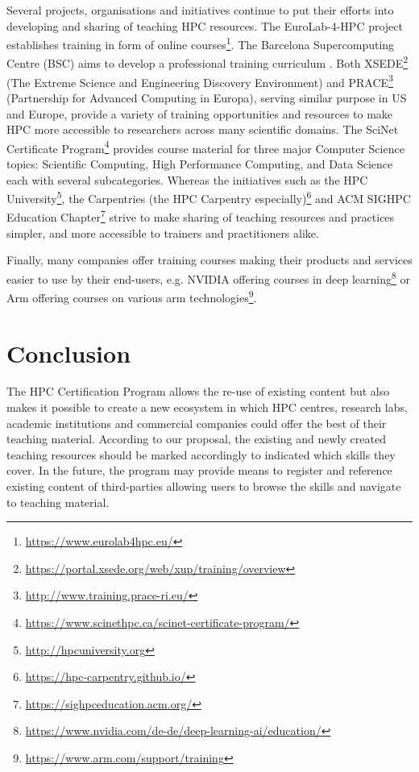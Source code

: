 \documentclass[jocse]{jocseart}
\begin{document}
Several projects, organisations and initiatives continue to put their efforts into developing and sharing of teaching HPC resources.
The EuroLab-4-HPC project establishes training in form of online courses\footnote{\url{https://www.eurolab4hpc.eu/}}.
The Barcelona Supercomputing Centre (BSC) aims to develop a professional training curriculum \cite{sancho2016bsc}.
Both XSEDE\footnote{\url{https://portal.xsede.org/web/xup/training/overview}} (The Extreme Science and Engineering Discovery Environment) and PRACE\footnote{\url{http://www.training.prace-ri.eu/}} (Partnership for Advanced Computing in Europa), serving similar purpose in US and Europe, provide a variety of training opportunities and resources to make HPC more accessible to researchers across many scientific domains.
The SciNet Certificate Program\footnote{\url{https://www.scinethpc.ca/scinet-certificate-program/}} provides course material for three major Computer Science topics: Scientific Computing, High Performance Computing, and Data Science each with several subcategories.
Whereas the initiatives such as the HPC University\footnote{\url{http://hpcuniversity.org}}, the Carpentries (the HPC Carpentry especially)\footnote{\url{https://hpc-carpentry.github.io/}} and ACM SIGHPC Education Chapter\footnote{\url{https://sighpceducation.acm.org/}} strive to make sharing of teaching resources and practices simpler, and more accessible to trainers and practitioners alike.

Finally, many companies offer training courses making their products and services easier to use by their end-users, e.g. NVIDIA offering courses in deep learning\footnote{\url{https://www.nvidia.com/de-de/deep-learning-ai/education/}} or Arm offering courses on various arm technologies\footnote{\url{https://www.arm.com/support/training}}.

\section{Conclusion}
\label{sec:conclusion}

The HPC Certification Program allows the re-use of existing content but also makes it possible to create a new ecosystem in which HPC centres, research labs, academic institutions and commercial companies could offer the best of their teaching material.
According to our proposal, the existing and newly created teaching resources should be marked accordingly to indicated which skills they cover.
In the future, the program may provide means to register and reference existing content of third-parties allowing users to browse the skills and navigate to teaching material.
\end{document}
